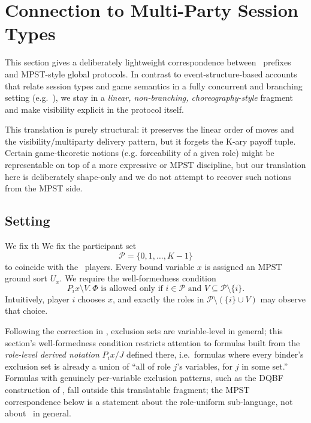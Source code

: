\section{Connection to Multi-Party Session Types}
\label{sec:mpst-connection}

This section gives a deliberately lightweight correspondence between \KFOL\ prefixes and MPST-style global protocols. In contrast to event-structure-based accounts that relate session types and game semantics in a fully concurrent and branching setting (e.g.\ \cite{CastellanYoshidaSessionGame}), we stay in a \emph{linear, non-branching, choreography-style} fragment and make visibility explicit in the protocol itself.

This translation is purely structural: it preserves the linear order of moves and the visibility/multiparty delivery pattern, but it forgets the K-ary payoff tuple. Certain game-theoretic notions (e.g. forceability of a given role) might be representable on top of a more expressive or MPST discipline, but our translation here is deliberately shape-only and we do not attempt to recover such notions from the MPST side.

\subsection{Setting}

We fix th
We fix the participant set
\[
  \mathcal{P} = \{0,1,\dots,K-1\}
\]
to coincide with the \KFOL\ players. Every bound variable $x$ is assigned an MPST ground sort $U_x$. We require the well-formedness condition
\[
  P_i x \setminus V.\,\Phi \text{ is allowed only if } i \in \mathcal{P} \text{ and } V \subseteq \mathcal{P} \setminus \{i\}.
\]
Intuitively, player $i$ chooses $x$, and exactly the roles in $\mathcal{P} \setminus (\{i\} \cup V)$ may observe that choice.

Following the correction in , exclusion sets are
variable-level in general; this section's well-formedness condition
restricts attention to formulas built from the \emph{role-level derived
notation} $P_i x/J$ defined there, i.e.\ formulas where every binder's
exclusion set is already a union of ``all of role $j$'s variables, for
$j$ in some set.'' Formulas with genuinely per-variable exclusion patterns,
such as the DQBF construction of , fall outside this
translatable fragment; the MPST correspondence below is a statement about the
role-uniform sub-language, not about \KFOL\ in general.

